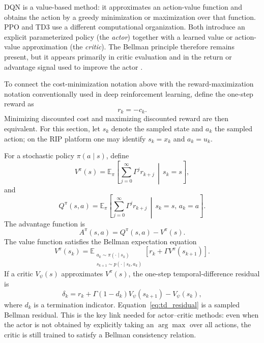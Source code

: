 \documentclass[11pt]{article}
\begin{document}
DQN is a value-based method: it approximates an action-value function and obtains the action by a greedy minimization or maximization over that function. PPO and TD3 use a different computational organization. Both introduce an explicit parameterized policy (the \emph{actor}) together with a learned value or action-value approximation (the \emph{critic}). The Bellman principle therefore remains present, but it appears primarily in critic evaluation and in the return or advantage signal used to improve the actor \cite{sutton2018rl}.

To connect the cost-minimization notation above with the reward-maximization notation conventionally used in deep reinforcement learning, define the one-step reward as
\begin{equation}
r_k=-c_k.
\label{eq:reward_cost_sign}
\end{equation}
Minimizing discounted cost and maximizing discounted reward are then equivalent. For this section, let $s_k$ denote the sampled state and $a_k$ the sampled action; on the RIP platform one may identify $s_k=x_k$ and $a_k=u_k$.

For a stochastic policy $\pi(a\mid s)$, define
\begin{equation}
V^{\pi}(s)
=\mathbb{E}_{\pi}\!\left[
\sum_{j=0}^{\infty}\Gamma^j r_{k+j}
\,\middle|\,s_k=s
\right],
\label{eq:Vpi}
\end{equation}
and
\begin{equation}
Q^{\pi}(s,a)
=\mathbb{E}_{\pi}\!\left[
\sum_{j=0}^{\infty}\Gamma^j r_{k+j}
\,\middle|\,s_k=s,\,a_k=a
\right].
\label{eq:Qpi}
\end{equation}
The advantage function is
\begin{equation}
A^{\pi}(s,a)=Q^{\pi}(s,a)-V^{\pi}(s).
\label{eq:advantage_def}
\end{equation}
The value function satisfies the Bellman expectation equation
\begin{equation}
V^{\pi}(s_k)
=
\mathbb{E}_{\substack{a_k\sim\pi(\cdot\mid s_k)\\s_{k+1}\sim p(\cdot\mid s_k,a_k)}}
\left[
 r_k+\Gamma V^{\pi}(s_{k+1})
\right].
\label{eq:bellman_expectation_V}
\end{equation}
If a critic $V_{\psi}(s)$ approximates $V^{\pi}(s)$, the one-step temporal-difference residual is
\begin{equation}
\delta_k
=r_k+\Gamma(1-d_k)V_{\psi}(s_{k+1})-V_{\psi}(s_k),
\label{eq:td_residual}
\end{equation}
where $d_k$ is a termination indicator. Equation~\eqref{eq:td_residual} is a sampled Bellman residual. This is the key link needed for actor--critic methods: even when the actor is not obtained by explicitly taking an $\arg\max$ over all actions, the critic is still trained to satisfy a Bellman consistency relation.
\end{document}
